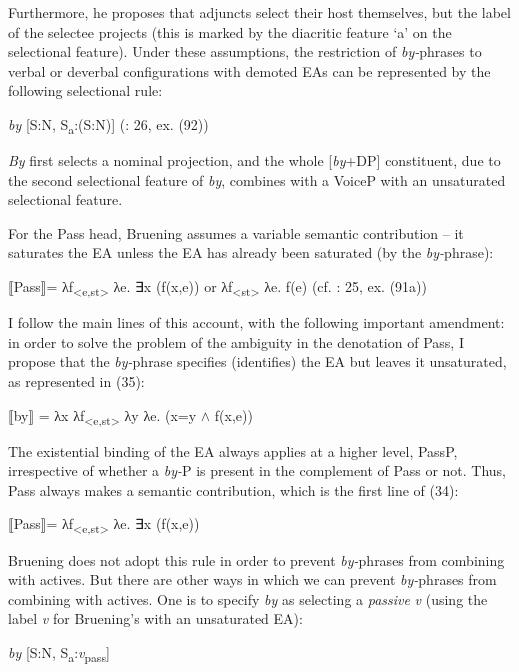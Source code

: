 \documentclass[output=paper]{langsci/langscibook}
\begin{document}
Furthermore, he proposes that adjuncts select their host themselves, but the label of the selectee projects (this is marked by the diacritic feature ‘a' on the selectional feature). Under these assumptions, the restriction of \textit{by-}phrases to verbal or deverbal configurations with demoted EAs can be represented by the following selectional rule:

\ea%
    \label{ex:giurgea:33}
    \textit{by} [S:N, S\textsubscript{a}:(S:N)]  (\citealt{Bruening2012}: 26, ex. (92))
\z

\textit{By} first selects a nominal projection, and the whole [\textit{by}+DP] constituent, due to the second selectional feature of \textit{by}, combines with a VoiceP with an unsaturated selectional feature. 

For the Pass head, Bruening assumes a variable semantic contribution – it saturates the EA unless the EA has already been saturated (by the \textit{by-}phrase):

\ea%
    \label{ex:giurgea:34}
    ⟦Pass⟧= λf\textsubscript{<e,st>} λe. ∃x (f(x,e))  or  λf\textsubscript{<st>} λe. f(e)   (cf. \citealt{Bruening2012}: 25, ex. (91a))
\z
    
I follow the main lines of this account, with the following important amendment: in order to solve the problem of the ambiguity in the denotation of Pass, I propose that the \textit{by-}phrase specifies (identifies) the EA but leaves it unsaturated, as represented in (35):

\ea%
    \label{ex:giurgea:35}
    ⟦by⟧ = λx λf\textsubscript{<e,st>} λy λe. (x=y $\wedge$ f(x,e))
\z

The existential binding of the EA always applies at a higher level, PassP, irrespective of whether a \textit{by-}P is present in the complement of Pass or not. Thus, Pass always makes a semantic contribution, which is the first line of (34):

\ea%
    \label{ex:giurgea:36}
⟦Pass⟧= λf\textsubscript{<e,st>} λe. ∃x (f(x,e))
\z


Bruening does not adopt this rule in order to prevent \textit{by-}phrases from combining with actives. But there are other ways in which we can prevent \textit{by-}phrases from combining with actives. One is to specify \textit{by} as selecting a \textit{passive} \textit{v} (using the label \textit{v} for Bruening’s  with an unsaturated EA):

\ea%
    \label{ex:giurgea:37}
    \textit{by} [S:N, S\textsubscript{a}:\textit{v}\textsubscript{pass}]
\z
\end{document}
